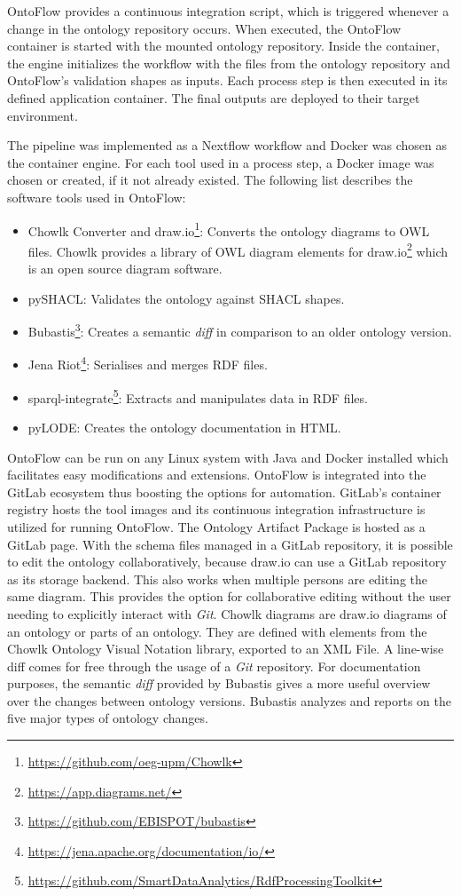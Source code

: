 \documentclass[runningheads]{llncs}
\begin{document}
OntoFlow provides a continuous integration script, which is triggered whenever a change in the ontology repository occurs. When executed, the OntoFlow container is started with the mounted ontology repository. Inside the container, the engine initializes the workflow with the files from the ontology repository and OntoFlow's validation shapes as inputs. Each process step is then executed in its defined application container. The final outputs are deployed to their target environment.

The pipeline was implemented as a Nextflow \cite{Tommaso} workflow and Docker was chosen as the container engine. For each tool used in a process step, a Docker image was chosen or created, if it not already existed. The following list describes the software tools used in OntoFlow:

\begin{itemize}
	\item Chowlk Converter and draw.io\footnote{\url{https://github.com/oeg-upm/Chowlk}}: Converts the ontology diagrams to OWL files. Chowlk\cite{ChavezFeria} provides a library of OWL diagram elements for draw.io\footnote{\url{https://app.diagrams.net/}} which is an open source diagram software.
	\item pySHACL: Validates the ontology against SHACL shapes.
	\item Bubastis\footnote{\url{https://github.com/EBISPOT/bubastis}}: Creates a semantic \textit{diff} in comparison to an older ontology version.
	\item Jena Riot\footnote{\url{https://jena.apache.org/documentation/io/}}: Serialises and merges RDF files.
	\item sparql-integrate\footnote{\url{https://github.com/SmartDataAnalytics/RdfProcessingToolkit}}: Extracts and manipulates data in RDF files.
	\item pyLODE: Creates the ontology documentation in HTML.
\end{itemize}
OntoFlow can be run on any Linux system with Java and Docker installed which facilitates easy modifications and extensions. OntoFlow is integrated into the GitLab ecosystem thus boosting the options for automation. GitLab's container registry hosts the tool images and its continuous integration infrastructure is utilized for running OntoFlow. The Ontology Artifact Package is hosted as a GitLab page. With the schema files managed in a GitLab repository, it is possible to edit the ontology collaboratively, because draw.io can use a GitLab repository as its storage backend. This also works when multiple persons are editing the same diagram. This provides the option for collaborative editing without the user needing to explicitly interact with \textit{Git}. Chowlk diagrams are draw.io diagrams of an ontology or parts of an ontology. They are defined with elements from the Chowlk Ontology Visual Notation library, exported to an XML File. A line-wise diff comes for free through the usage of a \textit{Git} repository. For documentation purposes, the semantic \textit{diff} provided by Bubastis\cite{malone} gives a more useful overview over the changes between ontology versions. Bubastis analyzes and reports on the five major types of ontology changes.
\end{document}
